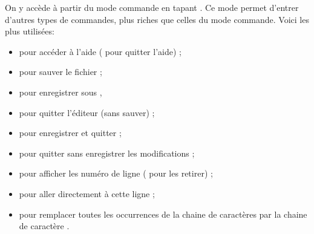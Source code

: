 \documentclass[a4paper,11pt]{style-esi/td}
\begin{document}
				On y accède à partir du mode commande en tapant \kbd{:}.
				Ce mode permet d'entrer d'autres types de commandes,
				plus riches que celles du mode commande. 
				Voici les plus utilisées:
				\begin{itemize}
				\item {} pour accéder à l'aide ( pour quitter l'aide) ;
				\item {} pour sauver le fichier ;
				\item {} pour enregistrer sous ,
				\item {} pour quitter l'éditeur (sans sauver) ;
				\item {} pour enregistrer et quitter ;
				\item {} pour quitter sans enregistrer les modifications ;
				\item {} pour afficher les numéro de ligne 
					( pour les retirer) ;
				\item {} pour aller directement à cette ligne ;
				\item {} 
					pour remplacer toutes les occurrences de la chaine de caractères 
					 par la chaine de caractère .
				\end{itemize}
		
\end{document}

